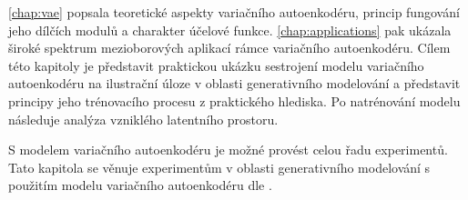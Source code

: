 \autoref{chap:vae} popsala teoretické aspekty variačního autoenkodéru, princip fungování jeho dílčích modulů a charakter účelové funkce.
\autoref{chap:applications} pak ukázala široké spektrum mezioborových aplikací rámce variačního autoenkodéru.
Cílem této kapitoly je představit praktickou ukázku sestrojení modelu variačního autoenkodéru na ilustrační úloze v oblasti generativního modelování a představit principy jeho trénovacího procesu z praktického hlediska.
Po natrénování modelu následuje analýza vzniklého latentního prostoru.

S modelem variačního autoenkodéru je možné provést celou řadu experimentů.
Tato kapitola se věnuje experimentům v oblasti generativního modelování s použitím modelu variačního autoenkodéru dle \textcite{Kingma2014}.